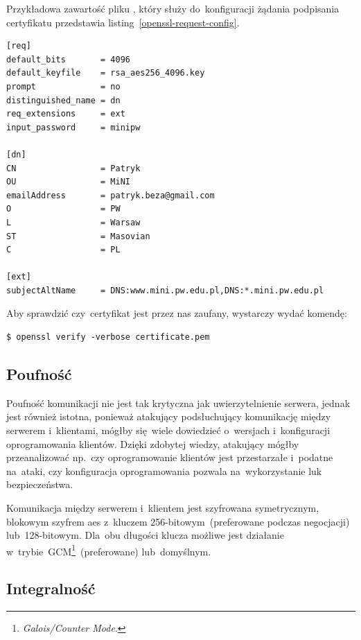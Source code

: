 \documentclass[thesis]{subfiles}
\begin{document}
Przykładowa zawartość pliku , który służy do~konfiguracji żądania podpisania certyfikatu przedstawia listing~\ref{openssl-request-config}.

\begin{lstlisting}[numbers=none,caption={Plik z~konfiguracją certyfikatu X.509},label=openssl-request-config]
[req]
default_bits       = 4096
default_keyfile    = rsa_aes256_4096.key
prompt             = no
distinguished_name = dn
req_extensions     = ext
input_password     = minipw

[dn]
CN                 = Patryk
OU                 = MiNI
emailAddress       = patryk.beza@gmail.com
O                  = PW
L                  = Warsaw
ST                 = Masovian
C                  = PL

[ext]
subjectAltName     = DNS:www.mini.pw.edu.pl,DNS:*.mini.pw.edu.pl
\end{lstlisting}

Aby sprawdzić czy~certyfikat jest przez nas zaufany, wystarczy wydać komendę:
\begin{lstlisting}[numbers=none]
$ openssl verify -verbose certificate.pem
\end{lstlisting}


\subsection{Poufność}

Poufność komunikacji nie jest tak krytyczna jak uwierzytelnienie serwera, jednak jest również istotna, ponieważ atakujący podsłuchujący komunikację między serwerem i~klientami, mógłby się~wiele dowiedzieć o~wersjach i~konfiguracji oprogramowania klientów. Dzięki zdobytej wiedzy, atakujący mógłby przeanalizować np.~czy oprogramowanie klientów jest przestarzałe i~podatne na~ataki, czy konfiguracja oprogramowania pozwala na~wykorzystanie luk bezpieczeństwa.

Komunikacja między serwerem i~klientem jest szyfrowana symetrycznym, blokowym szyfrem \gls{aes} z~kluczem 256-bitowym~(preferowane podczas negocjacji) lub~128-bitowym. Dla~obu długości klucza możliwe jest działanie w~trybie~GCM\footnote{\emph{Galois/Counter Mode}.}~(preferowane) lub~domyślnym.


\subsection{Integralność}
\end{document}
